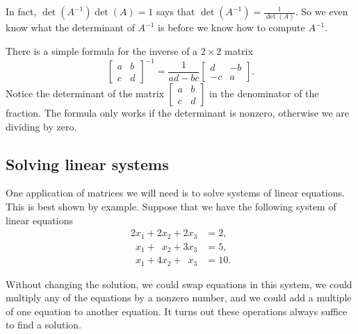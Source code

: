 In fact, $\det(A^{-1}) \det(A) = 1$ says that $\det(A^{-1}) =
\frac{1}{\det(A)}$.  So we even know what the determinant of $A^{-1}$ is
before we know how to compute $A^{-1}$.

There is a simple formula for the inverse of a $2 \times 2$ matrix
\begin{equation*}
\begin{bmatrix}
a & b \\
c & d
\end{bmatrix}^{-1}
=
\frac{1}{ad-bc}
\begin{bmatrix}
d & -b \\
-c & a
\end{bmatrix} .
\end{equation*}
Notice the determinant of the matrix
$[\begin{smallmatrix}a&b\\c&d\end{smallmatrix}]$
in the denominator of the fraction.
The formula only works if the determinant is nonzero, otherwise we are
dividing by zero.

\subsection{Solving linear systems}

One application of matrices we will need is to solve systems of
linear equations.  This is best shown by example.
Suppose that we have the following system of linear equations
\begin{align*}
          2 x_1 +           2 x_2 +           2 x_3 & = 2 , \\
\phantom{9} x_1 + \phantom{9} x_2 +           3 x_3 & = 5 , \\
\phantom{9} x_1 +           4 x_2 + \phantom{9} x_3 & = 10 .
\end{align*}

Without changing the solution,
we could swap equations in this system,
we could multiply any of the equations by a nonzero number, and
we could add a multiple of one equation to another equation.
It turns out these operations always suffice to find a solution.

